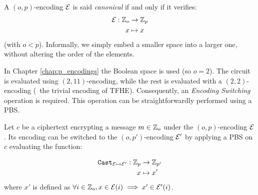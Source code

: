 \begin{definition}
	\label{def:canonical-encoding}
	A $(o, p)$-encoding $\mathcal{E}$ is said \textit{canonical} if and only if it verifies: 
	\begin{align*}
		\mathcal{E}: \mathbb{Z}_o &\rightarrow \mathbb{Z}_p\\
		x &\mapsto x
	\end{align*}
	(with $o < p$). Informally, we simply embed a smaller space into a larger one, without altering the order of the elements.
\end{definition}


In Chapter \ref{chap:p_encodings} the Boolean space is used (so $o=2$). The \SubBytes circuit is evaluated using $(2,11)$-encoding, while the rest is evaluated with a $(2, 2)$-encoding (\ie~the trivial encoding of TFHE). Consequently, an \textit{Encoding Switching} operation is required. This operation can be straightforwardly performed using a PBS.

\begin{definition}
	\label{def:encoding-switching}
	Let $c$ be a ciphertext encrypting a message $m \in \mathbb{Z}_o$ under the $(o, p)$-encoding $\mathcal{E}$. Its encoding can be switched to the $(o, p')$-encoding $\mathcal{E}'$ by applying a PBS on $c$ evaluating the function:
	
	\begin{align*}
		\texttt{Cast}_{\mathcal{E} \mapsto \mathcal{E}'}: \mathbb{Z}_p &\rightarrow \mathbb{Z}_{p'}\\
		x &\mapsto x'
	\end{align*}
	where $x'$ is defined as $\forall i \in \mathbb{Z}_o, x \in \mathcal{E}(i) \implies x' \in \mathcal{E}'(i)$.
\end{definition}


